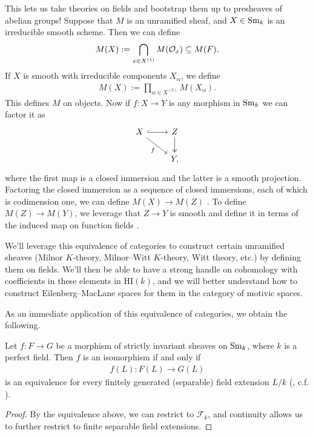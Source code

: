 \documentclass[11pt,openany]{book}
\providecommand{\HI}{\mathrm{HI}}
\begin{document}
This lets us take theories on fields and bootstrap them up to presheaves of abelian groups! Suppose that $M$ is an unramified sheaf, and $X\in \mathrm{Sm}_k$ is an irreducible smooth scheme. Then we can define
\begin{align*}
    M(X) := \bigcap_{x\in X^{(1)}} M(\mathcal{O}_x) \subseteq M(F).
\end{align*}
If $X$ is smooth with irreducible components $X_\alpha$, we define
\begin{align*}
    M(X) := \prod_{\alpha\in X^{(0)}}M(X_\alpha).
\end{align*}
This defines $M$ on objects. Now if $f \colon X \to Y$ is any morphism in $\mathrm{Sm}_k$ we can factor it as
\[ \begin{tikzcd}
    X\rar[hook]\ar[dr,"f" below left] & Z\dar[two heads]\\
     & Y,
\end{tikzcd} \]
where the first map is a closed immersion and the latter is a smooth projection. Factoring the closed immersion as a sequence of closed immersions, each of which is codimension one, we can define $M(X) \to M(Z)$ \cite[2.13]{Morel}. To define $M(Z) \to M(Y)$, we leverage that $Z \to Y$ is smooth and define it in terms of the induced map on function fields \cite[p.~17]{Morel}.


\begin{motivation} We'll leverage this equivalence of categories to construct certain unramified sheaves (Milnor $K$-theory, Milnor--Witt $K$-theory, Witt theory, etc.) by defining them on fields. We'll then be able to have a strong handle on cohomology with coefficients in these elements in $\HI(k)$, and we will better understand how to construct Eilenberg--MacLane spaces for them in the category of motivic spaces.
\end{motivation}

As an immediate application of this equivalence of categories, we obtain the following.

\begin{theorem}
Let $f \colon F\to G$ be a morphism of strictly invariant sheaves on $\mathrm{Sm}_k$, where $k$ is a perfect field. Then $f$ is an isomorphism if and only if
\begin{align*}
    f(L) \colon F(L) \to G(L)
\end{align*}
is an equivalence for every finitely generated (separable) field extension $L/k$ (\cite[2.3,~2.8]{Morel}, c.f. \cite[2.7]{HMH}).
\end{theorem}
\begin{proof} By the equivalence above, we can restrict to $\mathcal{F}_k$, and continuity allows us to further restrict to finite separable field extensions.
\end{proof}
\end{document}
